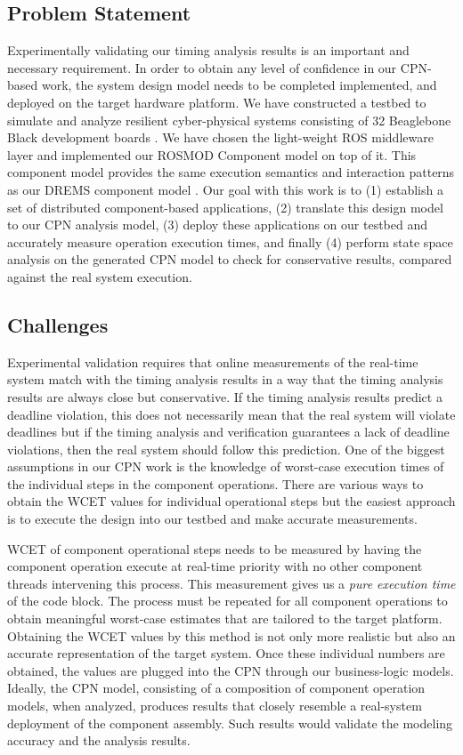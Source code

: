 \subsection{Problem Statement}

Experimentally validating our timing analysis results is an important and necessary requirement. In order to obtain any level of confidence in our CPN-based work, the system design model needs to be completed implemented, and deployed on the target hardware platform. We have constructed a testbed \cite{kumarTestbed} to simulate and analyze resilient cyber-physical systems consisting of 32 Beaglebone Black development boards \cite{BBB}. We have chosen the light-weight ROS \cite{ROS} middleware layer and implemented our ROSMOD Component model \cite{kumarROSMOD} on top of it. This component model provides the same execution semantics and interaction patterns as our DREMS component model \cite{ISIS_F6_ISORC:13}. Our goal with this work is to (1) establish a set of distributed component-based applications, (2) translate this design model to our CPN analysis model, (3) deploy these applications on our testbed and accurately measure operation execution times, and finally (4) perform state space analysis on the generated CPN model to check for conservative results, compared against the real system execution.

\subsection{Challenges}

Experimental validation requires that online measurements of the real-time system match with the timing analysis results in a way that the timing analysis results are always close but conservative. If the timing analysis results predict a deadline violation, this does not necessarily mean that the real system will violate deadlines but if the timing analysis and verification guarantees a lack of deadline violations, then the real system should follow this prediction. One of the biggest assumptions in our CPN work is the knowledge of worst-case execution times of the individual steps in the component operations. There are various ways to obtain the WCET values for individual operational steps but the easiest approach is to execute the design into our testbed and make accurate measurements.

WCET of component operational steps needs to be measured by having the component operation execute at real-time priority with no other component threads intervening this process. This measurement gives us a \emph{pure execution time} of the code block. The process must be repeated for all component operations to obtain meaningful worst-case estimates that are tailored to the target platform. Obtaining the WCET values by this method is not only more realistic but also an accurate representation of the target system. Once these individual numbers are obtained, the values are plugged into the CPN through our business-logic models. Ideally, the CPN model, consisting of a composition of component operation models, when analyzed, produces results that closely resemble a real-system deployment of the component assembly. Such results would validate the modeling accuracy and the analysis results.

